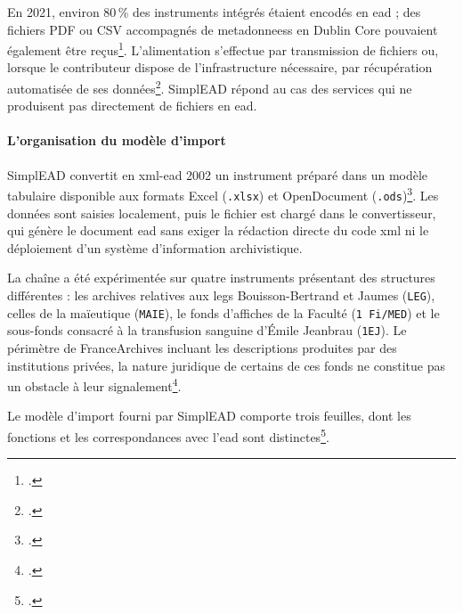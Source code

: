 En 2021, environ 80\,\% des instruments intégrés étaient encodés en \gls{ead} ; des fichiers PDF ou CSV accompagnés de \glspl{metadonnees} en Dublin Core pouvaient également être reçus\footcite[p.~36]{Restif2021}. L'alimentation s'effectue par transmission de fichiers ou, lorsque le contributeur dispose de l'infrastructure nécessaire, par récupération automatisée de ses données\footcite{FranceArchivesRejoindre2026}. SimplEAD répond au cas des services qui ne produisent pas directement de fichiers en \gls{ead}.

\paragraph{L'organisation du modèle d'import}

SimplEAD convertit en \gls{xml}-\gls{ead} 2002 un instrument préparé dans un modèle tabulaire disponible aux formats Excel (\texttt{.xlsx}) et OpenDocument (\texttt{.ods})\footcite{FranceArchivesSimplEAD}. Les données sont saisies localement, puis le fichier est chargé dans le convertisseur, qui génère le document \gls{ead} sans exiger la rédaction directe du code \gls{xml} ni le déploiement d'un système d'information archivistique.

La chaîne a été expérimentée sur quatre instruments présentant des structures différentes : les archives relatives aux legs Bouisson-Bertrand et Jaumes (\texttt{LEG}), celles de la maïeutique (\texttt{MAIE}), le fonds d'affiches de la Faculté (\texttt{1 Fi/MED}) et le sous-fonds consacré à la transfusion sanguine d'Émile Jeanbrau (\texttt{1EJ}). Le périmètre de FranceArchives incluant les descriptions produites par des institutions privées, la nature juridique de certains de ces fonds ne constitue pas un obstacle à leur \gls{signalement}\footcite[p.~35]{Restif2021}.

Le modèle d'import fourni par SimplEAD comporte trois feuilles, dont les fonctions et les correspondances avec l'\gls{ead} sont distinctes\footcite{FranceArchivesSimplEADDocumentation}.

